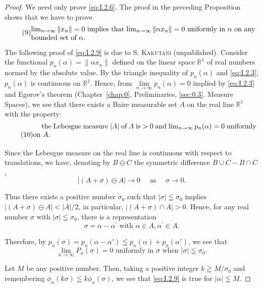 \begin{proof}
 We need only prove \eqref{eq:I.2.6}. The proof in the preceding Proposition shows that we have to prove 
\begin{equation}
\tag{9}\label{eq:I.2.9}
\begin{minipage}{0.92\linewidth}
\everymath{}\let\limits\nolimits
$\lim\limits_{n \rightarrow \infty} \| x_{n} \| = 0$ implies that $\lim\limits_{n \rightarrow \infty} \| \alpha x_{n} \| = 0$ uniformly in $\alpha$ on any bounded set of $\alpha.$
\end{minipage}
\end{equation}

The following proof of \eqref{eq:I.2.9} is due to S. \textsc{Kakutani} (unpublished). Consider the functional $p_n(\alpha) = \|\alpha x_n\|$ defined on the linear space $\mathbb{R}^{1}$ of real numbers normed by the absolute value. By the triangle inequality of $p_n(\alpha)$ and \eqref{eq:I.2.3}, $p_n(\alpha)$ is continuous on $\mathbb{R}^{1}$. Hence, from $\lim\limits_{n\to \infty}p_n(\alpha) = 0$ implied by \eqref{eq:I.2.3} and Egorov's theorem (Chapter~\ref{chap:0}, Preliminaries, \ref{sec:0.3}. Measure Spaces), we see that there exists a Baire measurable set $A$ on the real line $\mathbb{R}^{1}$ with the property: 
\begin{equation}\tag{10}\label{eq:I.2.10}
\parbox[b]{0.92\linewidth}{\setlength{\parindent}{1.2em}\indent
the Lebesgue measure $|A|$ of $A$ is $>0$ and $\lim\limits_{n\to\infty}p_n(\alpha)=0$ uniformly on $A$.}
\end{equation}


Since the Lebesgue measure on the real line is continuous with respect to translations, we have, denoting by $B \ominus C$ the symmetric difference $B \cup C- B \cap C$, 
\[
\left| (A + \sigma) \ominus A \right|\rightarrow 0 \quad \text{ as } \quad \sigma \rightarrow 0.
\]

Thus there exists a positive number $\sigma_0$ such that 
$|\sigma| \leqq \sigma_{0}$ implies $|(A + \sigma) \ominus A| < |A|/2$, in particular, $|(A + \sigma) \cap A| > 0$. Hence, for any real number $\sigma$ with $|\sigma| \leqq \sigma_{0}$, there is a representation 
\[
\sigma = \alpha- \alpha^{\prime} \text{ with } \alpha \in A, \alpha^{\prime} \in A.
\]

Therefore, by $p_n(\sigma) = p_n(\alpha- \alpha') \leqq p_n(\alpha) + p_n(\alpha')$, we see that 
\[
\lim\limits_{n \rightarrow \infty} P_{n} (\sigma) = 0 \text{ uniformly in } \sigma \text{ when } | \sigma | \leqq \sigma_{0}.
\]

Let $M$ be any positive number. Then, taking a positive integer $k \geqq M / \sigma_0$ and remembering $\phi_n(k\sigma) \leqq k\phi_n(\sigma)$, we see that \eqref{eq:I.2.9} is true for $|\alpha| \leqq M$. 
\end{proof}

